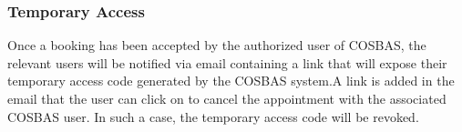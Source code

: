 	\subsubsection{Temporary Access}
	Once a booking has been accepted by the authorized user of COSBAS, the relevant users will be notified via email containing a link that will expose their temporary access code generated by the COSBAS system.A link is added in the email that the user can click on to cancel the appointment with the associated COSBAS user. In such a case, the temporary access code will be revoked.